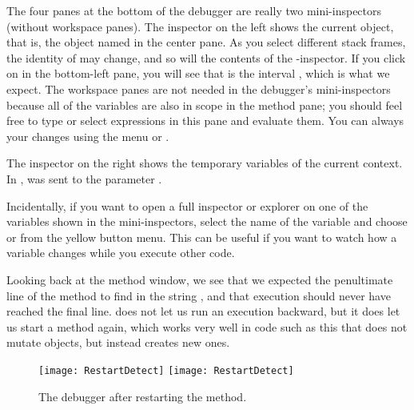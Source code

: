 \documentclass[a4paper,10pt,twoside]{book}
\begin{document}
The four panes at the bottom of the debugger are really two mini-inspectors (without workspace panes).
The inspector on the left shows the current object, that is, the object named \self in the center pane.
As you select different stack frames, the identity of \self may change, and so will the contents of the \self{}-inspector.
If you click on \self in the bottom-left pane, you will see that \self is the interval , which is what we expect.
The workspace panes are not needed in the debugger's mini-inspectors because all of the variables are also in scope in the method pane; you should feel free to type or select expressions in this pane and evaluate them.
You can always  your changes using the menu or .

The inspector on the right shows the temporary variables of the current context.
In ,  was sent to the parameter .


Incidentally, if you want to open a full inspector or explorer on one of the variables shown in the mini-inspectors, select the name of the variable and choose  or  from the yellow button menu.
This can be useful if you want to watch how a variable changes while you execute other code.

Looking back at the method window, we see that we expected the penultimate line of the method to find  in the string , and that execution should never have reached the final line.
\sq does not let us run an execution backward, but it does let us start a method again, which works very well in code such as this that does not mutate objects, but instead creates new ones.


\begin{figure}[btp]
	\begin{center}
	\ifluluelse
		{\texttt{[image: RestartDetect]}}
		{\texttt{[image: RestartDetect]}}
	\end{center}
	\caption{The debugger after restarting the  method.}
	\label{fig:RestartDetect}
\end{figure}
\end{document}
